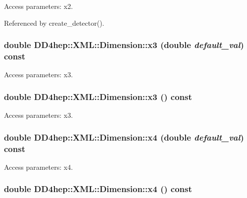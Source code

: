 Access parameters: x2. 

Referenced by create\_\-detector().\hypertarget{struct_d_d4hep_1_1_x_m_l_1_1_dimension_a624dd865621b71e1d918358c62b5b654}{
\subsubsection[{x3}]{\setlength{\rightskip}{0pt plus 5cm}double DD4hep::XML::Dimension::x3 (double {\em default\_\-val}) const}}
\label{struct_d_d4hep_1_1_x_m_l_1_1_dimension_a624dd865621b71e1d918358c62b5b654}


Access parameters: x3. \hypertarget{struct_d_d4hep_1_1_x_m_l_1_1_dimension_a626f5ec600e69c8aa45d516a5e118357}{
\subsubsection[{x3}]{\setlength{\rightskip}{0pt plus 5cm}double DD4hep::XML::Dimension::x3 () const}}
\label{struct_d_d4hep_1_1_x_m_l_1_1_dimension_a626f5ec600e69c8aa45d516a5e118357}


Access parameters: x3. \hypertarget{struct_d_d4hep_1_1_x_m_l_1_1_dimension_a1830f57dfa5b6ee7a9af03705ba16455}{
\subsubsection[{x4}]{\setlength{\rightskip}{0pt plus 5cm}double DD4hep::XML::Dimension::x4 (double {\em default\_\-val}) const}}
\label{struct_d_d4hep_1_1_x_m_l_1_1_dimension_a1830f57dfa5b6ee7a9af03705ba16455}


Access parameters: x4. \hypertarget{struct_d_d4hep_1_1_x_m_l_1_1_dimension_a966ddadbb0efc6126d17ba74aa787c7b}{
\subsubsection[{x4}]{\setlength{\rightskip}{0pt plus 5cm}double DD4hep::XML::Dimension::x4 () const}}
\label{struct_d_d4hep_1_1_x_m_l_1_1_dimension_a966ddadbb0efc6126d17ba74aa787c7b}


